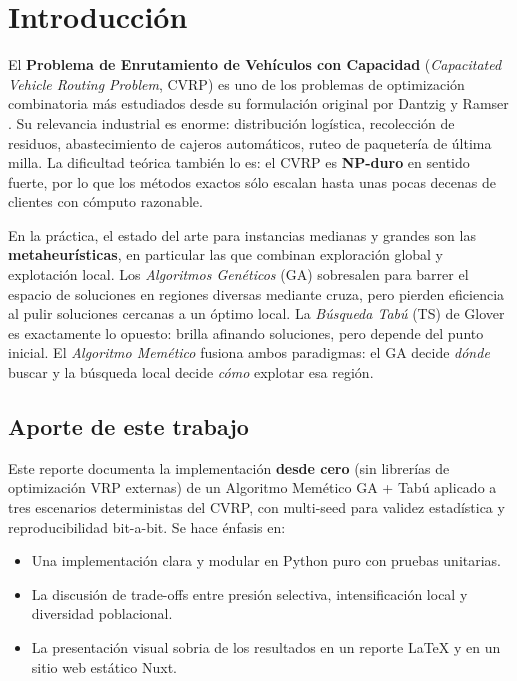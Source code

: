 \section{Introducción}
\label{sec:introduccion}

El \textbf{Problema de Enrutamiento de Vehículos con Capacidad} (\emph{Capacitated Vehicle Routing Problem}, CVRP) es uno de los problemas de optimización combinatoria más estudiados desde su formulación original por Dantzig y Ramser \cite{dantzig1959truck}. Su relevancia industrial es enorme: distribución logística, recolección de residuos, abastecimiento de cajeros automáticos, ruteo de paquetería de última milla. La dificultad teórica también lo es: el CVRP es \textbf{NP-duro} en sentido fuerte, por lo que los métodos exactos sólo escalan hasta unas pocas decenas de clientes con cómputo razonable.

En la práctica, el estado del arte para instancias medianas y grandes son las \textbf{metaheurísticas}, en particular las que combinan exploración global y explotación local. Los \emph{Algoritmos Genéticos} (GA) \cite{holland1975adaptation} sobresalen para barrer el espacio de soluciones en regiones diversas mediante cruza, pero pierden eficiencia al pulir soluciones cercanas a un óptimo local. La \emph{Búsqueda Tabú} (TS) de Glover \cite{glover1986future} es exactamente lo opuesto: brilla afinando soluciones, pero depende del punto inicial. El \emph{Algoritmo Memético} \cite{moscato1989evolution} fusiona ambos paradigmas: el GA decide \emph{dónde} buscar y la búsqueda local decide \emph{cómo} explotar esa región.

\subsection*{Aporte de este trabajo}

Este reporte documenta la implementación \textbf{desde cero} (sin librerías de optimización VRP externas) de un Algoritmo Memético GA + Tabú aplicado a tres escenarios deterministas del CVRP, con multi-seed para validez estadística y reproducibilidad bit-a-bit. Se hace énfasis en:

\begin{itemize}
    \item Una implementación clara y modular en Python puro con pruebas unitarias.
    \item La discusión de trade-offs entre presión selectiva, intensificación local y diversidad poblacional.
    \item La presentación visual sobria de los resultados en un reporte LaTeX y en un sitio web estático Nuxt.
\end{itemize}

